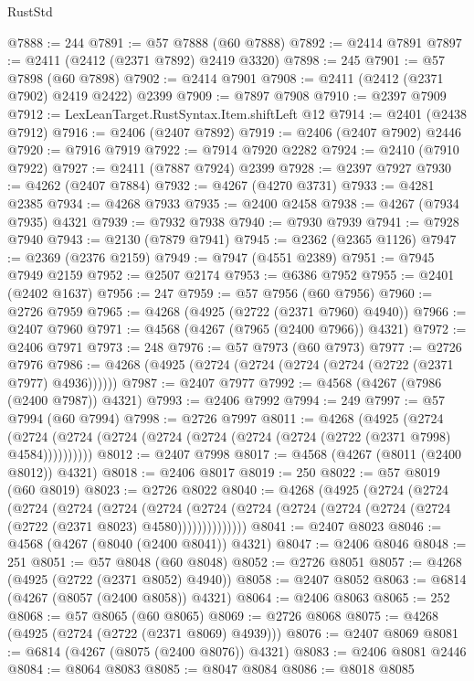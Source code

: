 \begin{lexlean}{RustStd}
\begin{coremodule}
@7888 := 244
@7891 := @57 @7888 (@60 @7888)
@7892 := @2414 @7891
@7897 := @2411 (@2412 (@2371 @7892) @2419 @3320)
@7898 := 245
@7901 := @57 @7898 (@60 @7898)
@7902 := @2414 @7901
@7908 := @2411 (@2412 (@2371 @7902) @2419 @2422) @2399
@7909 := @7897 @7908
@7910 := @2397 @7909
@7912 := LexLeanTarget.RustSyntax.Item.shiftLeft @12
@7914 := @2401 (@2438 @7912)
@7916 := @2406 (@2407 @7892)
@7919 := @2406 (@2407 @7902) @2446
@7920 := @7916 @7919
@7922 := @7914 @7920 @2282
@7924 := @2410 (@7910 @7922)
@7927 := @2411 (@7887 @7924) @2399
@7928 := @2397 @7927
@7930 := @4262 (@2407 @7884)
@7932 := @4267 (@4270 @3731)
@7933 := @4281 @2385
@7934 := @4268 @7933
@7935 := @2400 @2458
@7938 := @4267 (@7934 @7935) @4321
@7939 := @7932 @7938
@7940 := @7930 @7939
@7941 := @7928 @7940
@7943 := @2130 (@7879 @7941)
@7945 := @2362 (@2365 @1126)
@7947 := @2369 (@2376 @2159)
@7949 := @7947 (@4551 @2389)
@7951 := @7945 @7949 @2159
@7952 := @2507 @2174
@7953 := @6386 @7952
@7955 := @2401 (@2402 @1637)
@7956 := 247
@7959 := @57 @7956 (@60 @7956)
@7960 := @2726 @7959
@7965 := @4268 (@4925 (@2722 (@2371 @7960) @4940))
@7966 := @2407 @7960
@7971 := @4568 (@4267 (@7965 (@2400 @7966)) @4321)
@7972 := @2406 @7971
@7973 := 248
@7976 := @57 @7973 (@60 @7973)
@7977 := @2726 @7976
@7986 := @4268 (@4925 (@2724 (@2724 (@2724 (@2724 (@2722 (@2371 @7977) @4936))))))
@7987 := @2407 @7977
@7992 := @4568 (@4267 (@7986 (@2400 @7987)) @4321)
@7993 := @2406 @7992
@7994 := 249
@7997 := @57 @7994 (@60 @7994)
@7998 := @2726 @7997
@8011 := @4268
    (@4925
      (@2724 (@2724 (@2724 (@2724 (@2724 (@2724 (@2724 (@2724 (@2722 (@2371 @7998) @4584))))))))))
@8012 := @2407 @7998
@8017 := @4568 (@4267 (@8011 (@2400 @8012)) @4321)
@8018 := @2406 @8017
@8019 := 250
@8022 := @57 @8019 (@60 @8019)
@8023 := @2726 @8022
@8040 := @4268
    (@4925
      (@2724
        (@2724
          (@2724
            (@2724
              (@2724
                (@2724
                  (@2724 (@2724 (@2724 (@2724 (@2724 (@2724 (@2722 (@2371 @8023) @4580))))))))))))))
@8041 := @2407 @8023
@8046 := @4568 (@4267 (@8040 (@2400 @8041)) @4321)
@8047 := @2406 @8046
@8048 := 251
@8051 := @57 @8048 (@60 @8048)
@8052 := @2726 @8051
@8057 := @4268 (@4925 (@2722 (@2371 @8052) @4940))
@8058 := @2407 @8052
@8063 := @6814 (@4267 (@8057 (@2400 @8058)) @4321)
@8064 := @2406 @8063
@8065 := 252
@8068 := @57 @8065 (@60 @8065)
@8069 := @2726 @8068
@8075 := @4268 (@4925 (@2724 (@2722 (@2371 @8069) @4939)))
@8076 := @2407 @8069
@8081 := @6814 (@4267 (@8075 (@2400 @8076)) @4321)
@8083 := @2406 @8081 @2446
@8084 := @8064 @8083
@8085 := @8047 @8084
@8086 := @8018 @8085

\end{coremodule}
\end{lexlean}

